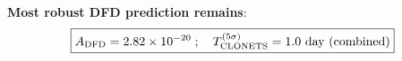 \documentclass[11pt]{article}
\newcommand{\ee}[1]{\times 10^{#1}}
\begin{document}
\begin{tcolorbox}[colback=blue!5!white, colframe=blue!60!black,
  title=\textbf{W3i7 P5+P13 Summary}]
\textbf{Most robust DFD prediction remains}:
\begin{equation}
\boxed{A_{\rm DFD} = 2.82\ee{-20}\;;\quad
T^{(5\sigma)}_{\rm CLONETS} = 1.0~\text{day (combined)}}
\end{equation}
\end{tcolorbox}
\end{document}
